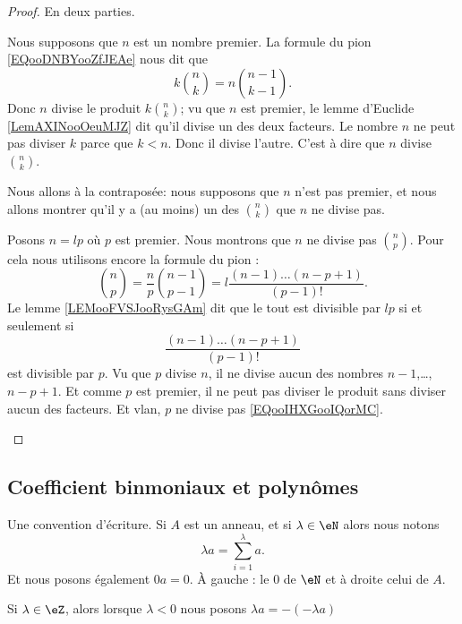 \begin{proof}
	En deux parties.
	\begin{subproof}
		\spitem[\( \Rightarrow\)]
		Nous supposons que \( n\) est un nombre premier. La formule du pion \eqref{EQooDNBYooZfJEAe} nous dit que
		\begin{equation}
			k\binom{ n }{ k }=n\binom{ n-1 }{ k-1 }.
		\end{equation}
		Donc \( n\) divise le produit \(k\binom{ n }{ k }\); vu que \( n\) est premier, le lemme d'Euclide \ref{LemAXINooOeuMJZ} dit qu'il divise un des deux facteurs. Le nombre \( n\) ne peut pas diviser \( k\) parce que \( k<n\). Donc il divise l'autre. C'est à dire que \( n\) divise \( \binom{ n }{ k }\).

		\spitem[\( \Leftarrow\)]
		Nous allons à la contraposée: nous supposons que \( n\) n'est pas premier, et nous allons montrer qu'il y a (au moins) un des \( \binom{ n }{ k }\) que \( n\) ne divise pas.

		Posons \( n=lp\) où \( p\) est premier. Nous montrons que \( n\) ne divise pas \( \binom{ n }{ p }\). Pour cela nous utilisons encore la formule du pion :
		\begin{equation}
			\binom{ n }{ p }=\frac{ n }{ p }\binom{ n-1 }{ p-1 }=l\frac{ (n-1)\ldots (n-p+1) }{ (p-1)! }.
		\end{equation}
		Le lemme \ref{LEMooFVSJooRysGAm} dit que le tout est divisible par \( lp\) si et seulement si
		\begin{equation}		\label{EQooIHXGooIQorMC}
			\frac{ (n-1)\ldots (n-p+1) }{ (p-1)! }
		\end{equation}
		est divisible par \( p\). Vu que \( p\) divise \( n\), il ne divise aucun des nombres \( n-1\),\ldots,\( n-p+1\). Et comme \( p\) est premier, il ne peut pas diviser le produit sans diviser aucun des facteurs. Et vlan, \( p\) ne divise pas \eqref{EQooIHXGooIQorMC}.
	\end{subproof}
\end{proof}

\subsection{Coefficient binmoniaux et polynômes}

\begin{normaltext}		\label{NORMooROXXooXOybXN}
	Une convention d'écriture. Si \( A\) est un anneau, et si \( \lambda\in \eN\) alors nous notons
	\begin{equation}
		\lambda a=\sum_{i=1}^{\lambda}a.
	\end{equation}
	Et nous posons également \( 0a=0\). À gauche : le \( 0\) de \( \eN\) et à droite celui de \( A\).

	Si \( \lambda\in \eZ\), alors lorsque \( \lambda<0\) nous posons \( \lambda a=  -(-\lambda a)  \)
\end{normaltext}


